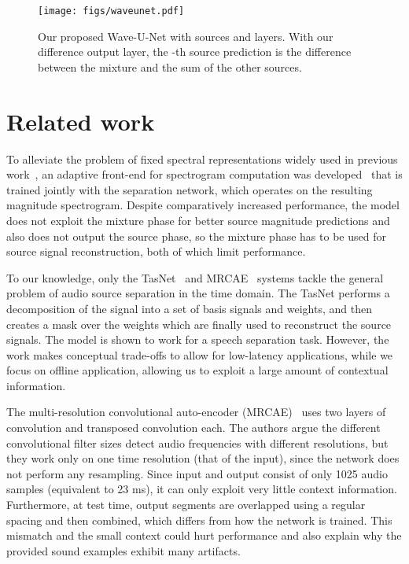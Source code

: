 \documentclass{article}
\begin{document}
\begin{figure}[t]
\centering
\centerline{\texttt{[image: figs/waveunet.pdf]}}
\caption{Our proposed Wave-U-Net with  sources and  layers. With our difference output layer, the -th source prediction is the difference between the mixture and the sum of the other sources.}
\label{fig:waveunet}
\end{figure}

\section{Related work}
\label{sec:related_work}

To alleviate the problem of fixed spectral representations widely used in previous work~\cite{Nugraha2015,Simpson2015, Miron2017, Huang2014,Luo2017,Uhlich2017}, an adaptive front-end for spectrogram computation was developed~\cite{Venkataramani2017} that is trained jointly with the separation network, which operates on the resulting magnitude spectrogram.
Despite comparatively increased performance, the model does not exploit the mixture phase for better source magnitude predictions and also does not output the source phase, so the mixture phase has to be used for source signal reconstruction, both of which limit performance.

To our knowledge, only the TasNet~\cite{Luo2017a} and MRCAE~\cite{Grais2018} systems tackle the general problem of audio source separation in the time domain.
The TasNet performs a decomposition of the signal into a set of basis signals and weights, and then creates a mask over the weights which are finally used to reconstruct the source signals. The model is shown to work for a speech separation task.
However, the work makes conceptual trade-offs to allow for low-latency applications, while we focus on offline application, allowing us to exploit a large amount of contextual information. 

The multi-resolution convolutional auto-encoder (MRCAE)~\cite{Grais2018} uses two layers of convolution and transposed convolution each.
The authors argue the different convolutional filter sizes detect audio frequencies with different resolutions, but they work only on one time resolution (that of the input), since the network does not perform any resampling.
Since input and output consist of only 1025 audio samples (equivalent to 23 ms), it can only exploit very little context information.
Furthermore, at test time, output segments are overlapped using a regular spacing and then combined, which differs from how the network is trained. This mismatch and the small context could hurt performance and also explain why the provided sound examples exhibit many artifacts.
\end{document}

